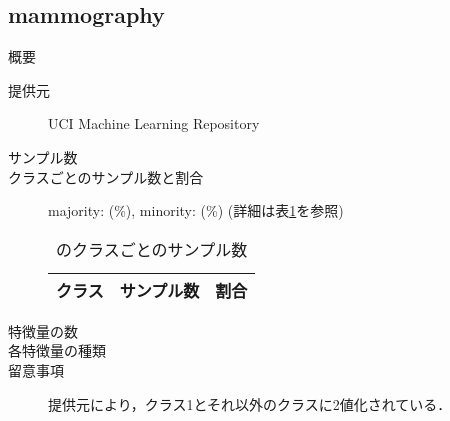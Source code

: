 \subsection{mammography}
\begin{description}
    \item[概要] \cite{}
    \item[提供元] UCI Machine Learning Repository
    \item[サンプル数] 
    \item[クラスごとのサンプル数と割合] majority:  (\%), minority:  (\%) (詳細は表\ref{tab:}を参照)

        \begin{table}[htbp]
            \centering
            \caption{のクラスごとのサンプル数}
            \label{tab:}
            \begin{tabular}{lrc} \hline
                \multicolumn{1}{c}{クラス}&
                \multicolumn{1}{c}{サンプル数}&
                \multicolumn{1}{c}{割合}\\
                \hline
                \hline

                \hline
            \end{tabular}
        \end{table}

    \item[特徴量の数] 
    \item[各特徴量の種類] \mbox{}
        
    \item[留意事項] 提供元により，クラス1とそれ以外のクラスに2値化されている．
\end{description}


